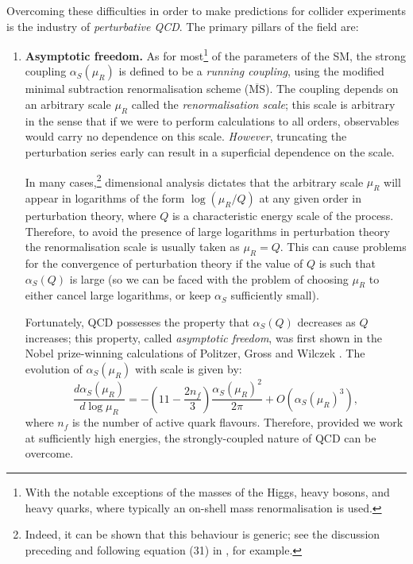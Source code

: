 \documentclass[withindex,glossary]{cam-thesis}
\begin{document}
Overcoming these difficulties in order to make predictions for collider experiments is the industry of \textit{perturbative QCD}. The primary pillars of the field are:
\begin{enumerate}[label = (\arabic*)]
\item \textbf{Asymptotic freedom.} As for most\footnote{With the notable exceptions of the masses of the Higgs, heavy bosons, and heavy quarks, where typically an on-shell mass renormalisation is used.} of the parameters of the SM, the strong coupling $\alpha_S(\mu_R)$ is defined to be a \textit{running coupling}, using the modified minimal subtraction renormalisation scheme ($\overline{\text{MS}}$). The coupling depends on an arbitrary scale $\mu_R$ called the \textit{renormalisation scale}; this scale is arbitrary in the sense that if we were to perform calculations to all orders, observables would carry no dependence on this scale. \textit{However}, truncating the perturbation series early can result in a superficial dependence on the scale. 

In many cases,\footnote{Indeed, it can be shown that this behaviour is generic; see the discussion preceding and following equation (31) in \cite{Delamotte:2002vw}, for example.} dimensional analysis dictates that the arbitrary scale $\mu_R$ will appear in logarithms of the form $\log(\mu_R / Q)$ at any given order in perturbation theory, where $Q$ is a characteristic energy scale of the process. Therefore, to avoid the presence of large logarithms in perturbation theory the renormalisation scale is usually taken as $\mu_R = Q$. This can cause problems for the convergence of perturbation theory if the value of $Q$ is such that $\alpha_S(Q)$ is large (so we can be faced with the problem of choosing $\mu_R$ to either cancel large logarithms, or keep $\alpha_S$ sufficiently small).

Fortunately, QCD possesses the property that $\alpha_S(Q)$ decreases as $Q$ increases; this property, called \textit{asymptotic freedom}, was first shown in the Nobel prize-winning calculations of Politzer, Gross and Wilczek \cite{Gross:1973id, Politzer:1973fx}. The evolution of $\alpha_S(\mu_R)$ with scale is given by: 
\begin{equation}
\label{eq:alphaSrunning}
\frac{d \alpha_S(\mu_R)}{d\log \mu_R} = - \left( 11 - \frac{2n_f}{3} \right) \frac{\alpha_S(\mu_R)^2}{2\pi} + O(\alpha_S(\mu_R)^3), 
\end{equation}
where $n_f$ is the number of active quark flavours. Therefore, provided we work at sufficiently high energies, the strongly-coupled nature of QCD can be overcome.


\end{enumerate}
\end{document}
